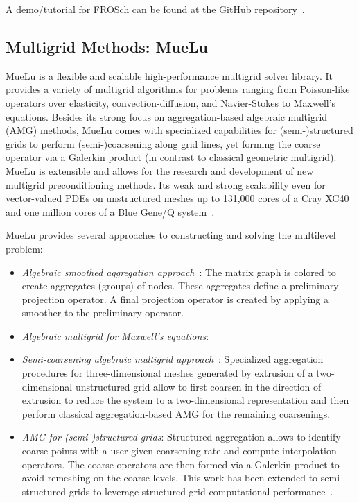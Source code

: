A demo/tutorial for FROSch can be found at the GitHub repository~\cite{frosch_demo}.

\subsection{Multigrid Methods: MueLu}

MueLu is a flexible and scalable high-performance multigrid solver library.
It provides a variety of multigrid algorithms for problems ranging from Poisson-like operators over elasticity, convection-diffusion, and Navier-Stokes to Maxwell’s equations.
Besides its strong focus on aggregation-based algebraic multigrid (AMG) methods,
MueLu comes with specialized capabilities for (semi-)structured grids to perform (semi-)coarsening along grid lines,
yet forming the coarse operator via a Galerkin product (in contrast to classical geometric multigrid).
MueLu is extensible and allows for the research and development of new multigrid preconditioning methods.
Its weak and strong scalability even for vector-valued PDEs on unstructured meshes
up to 131,000 cores of a Cray XC40 and one million cores of a Blue Gene/Q system~\cite{Lin2017a,Thomas2019a}. 


MueLu provides several approaches to constructing and solving the multilevel problem:

\begin{itemize}
\item \emph{Algebraic smoothed aggregation approach}~\cite{Vanek1996a}:
The matrix graph is colored to create aggregates (groups) of nodes.
These aggregates define a preliminary projection operator.
A final projection operator is created by applying a smoother to the preliminary operator.

\item \emph{Algebraic multigrid for Maxwell’s equations}:

\item \emph{Semi-coarsening algebraic multigrid approach}~:
Specialized aggregation procedures for three-dimensional meshes generated by extrusion of a two-dimensional unstructured grid
allow to first coarsen in the direction of extrusion to reduce the system to a two-dimensional representation and then perform classical aggregation-based AMG
for the remaining coarsenings.

\item \emph{AMG for (semi-)structured grids}:
Structured aggregation allows to identify coarse points with a user-given coarsening rate and compute interpolation operators.
The coarse operators are then formed via a Galerkin product to avoid remeshing on the coarse levels.
This work has been extended to semi-structured grids to leverage structured-grid computational performance~\cite{Mayr2022a}.

\end{itemize}

